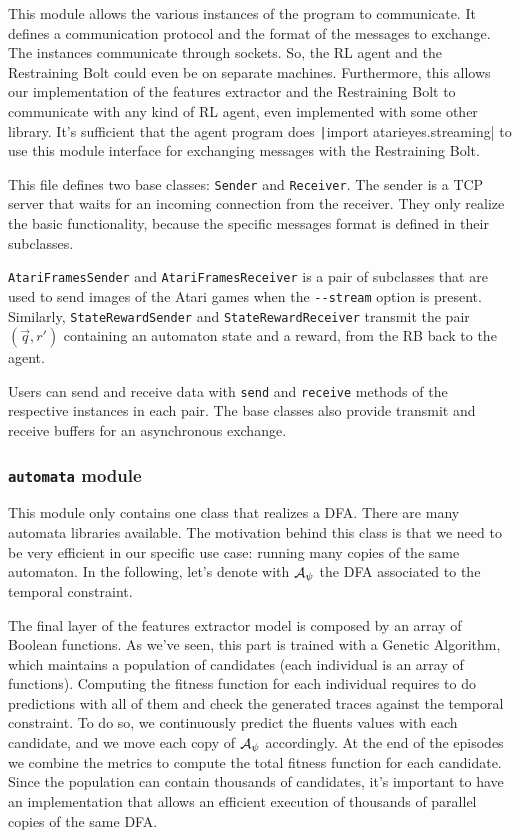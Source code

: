 This module allows the various instances of the program to communicate. It
defines a communication protocol and the format of the messages to exchange.
The instances communicate through sockets. So, the RL agent and the
Restraining Bolt could even be on separate machines. Furthermore, this allows
our implementation of the features extractor and the Restraining Bolt to
communicate with any kind of RL agent, even implemented with some other
library. It's sufficient that the agent program does
\texttt|import atarieyes.streaming| to use this module
interface for exchanging messages with the Restraining Bolt.

This file defines two base classes: \texttt{Sender} and \texttt{Receiver}.
The sender is a TCP server that waits for an incoming connection from the
receiver. They only realize the basic functionality, because the specific
messages format is defined in their subclasses.

\texttt{AtariFramesSender} and \texttt{AtariFramesReceiver} is a pair of
subclasses that are used to send images of the Atari games when the
\verb|--stream| option is present. Similarly, \texttt{StateRewardSender} and
\texttt{StateRewardReceiver} transmit the pair $(\vec{q}, r')$ containing an
automaton state and a reward, from the RB back to the agent.

Users can send and receive data with \texttt{send} and \texttt{receive}
methods of the respective instances in each pair.  The base classes also
provide transmit and receive buffers for an asynchronous exchange. 


\subsubsection*{\texttt{automata} module}

This module only contains one class that realizes a DFA. There are many
automata libraries available. The motivation behind this class is that we need
to be very efficient in our specific use case: running many copies of the same
automaton. In the following, let's denote with $\mathcal{A}_\psi$ the
DFA associated to the temporal constraint.

The final layer of the features extractor model is composed by an array of
Boolean functions. As we've seen, this part is trained with a Genetic
Algorithm, which maintains a population of candidates (each individual is an
array of functions). Computing the fitness function for each individual
requires to do predictions with all of them and check the generated traces
against the temporal constraint. To do so, we continuously predict the fluents
values with each candidate, and we move each copy of $\mathcal{A}_\psi$
accordingly. At the end of the episodes we combine the metrics to compute the
total fitness function for each candidate. Since the population can contain
thousands of candidates, it's important to have an implementation that allows
an efficient execution of thousands of parallel copies of the same DFA. 

